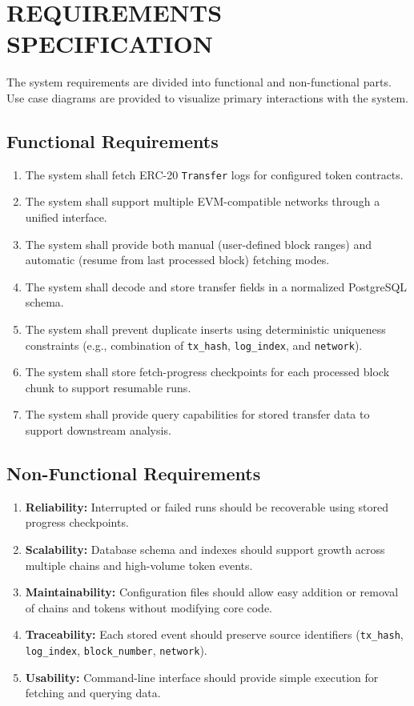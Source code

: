 \documentclass[a4paper,12pt]{report}
\begin{document}
\chapter{REQUIREMENTS SPECIFICATION}
The system requirements are divided into functional and non-functional parts. Use case diagrams are provided to visualize primary interactions with the system.

\section*{Functional Requirements}
\begin{enumerate}
    \item The system shall fetch ERC-20 \texttt{Transfer} logs for configured token contracts.
    \item The system shall support multiple EVM-compatible networks through a unified interface.
    \item The system shall provide both manual (user-defined block ranges) and automatic (resume from last processed block) fetching modes.
    \item The system shall decode and store transfer fields in a normalized PostgreSQL schema.
    \item The system shall prevent duplicate inserts using deterministic uniqueness constraints (e.g., combination of \texttt{tx\_hash}, \texttt{log\_index}, and \texttt{network}).
    \item The system shall store fetch-progress checkpoints for each processed block chunk to support resumable runs.
    \item The system shall provide query capabilities for stored transfer data to support downstream analysis.
\end{enumerate}

\section*{Non-Functional Requirements}
\begin{enumerate}
    \item \textbf{Reliability:} Interrupted or failed runs should be recoverable using stored progress checkpoints.
    \item \textbf{Scalability:} Database schema and indexes should support growth across multiple chains and high-volume token events.
    \item \textbf{Maintainability:} Configuration files should allow easy addition or removal of chains and tokens without modifying core code.
    \item \textbf{Traceability:} Each stored event should preserve source identifiers (\texttt{tx\_hash}, \texttt{log\_index}, \texttt{block\_number}, \texttt{network}).
    \item \textbf{Usability:} Command-line interface should provide simple execution for fetching and querying data.
\end{enumerate}
\end{document}
